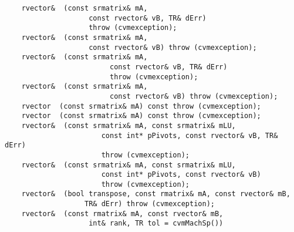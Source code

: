 \verb"    rvector& "\verb" (const srmatrix& mA,"\\
\verb"                    const rvector& vB, TR& dErr)"\\
\verb"                    throw (cvmexception);"\\
\verb"    rvector& "\verb" (const srmatrix& mA,"\\
\verb"                    const rvector& vB) throw (cvmexception);"\\
\verb"    rvector& "\verb" (const srmatrix& mA,"\\
\verb"                         const rvector& vB, TR& dErr)"\\
\verb"                         throw (cvmexception);"\\
\verb"    rvector& "\verb" (const srmatrix& mA,"\\
\verb"                         const rvector& vB) throw (cvmexception);"\\
\verb"    rvector "\verb" (const srmatrix& mA) const throw (cvmexception);"\\
\verb"    rvector "\verb" (const srmatrix& mA) const throw (cvmexception);"\\
\verb"    rvector& "\verb" (const srmatrix& mA, const srmatrix& mLU,"\\
\verb"                       const int* pPivots, const rvector& vB, TR& dErr)"\\
\verb"                       throw (cvmexception);"\\
\verb"    rvector& "\verb" (const srmatrix& mA, const srmatrix& mLU,"\\
\verb"                       const int* pPivots, const rvector& vB)"\\
\verb"                       throw (cvmexception);"\\
\verb"    rvector& "\verb" (bool transpose, const rmatrix& mA, const rvector& mB,"\\
\verb"                   TR& dErr) throw (cvmexception);"\\
\verb"    rvector& "\verb" (const rmatrix& mA, const rvector& mB,"\\
\verb"                    int& rank, TR tol = cvmMachSp())"\\
